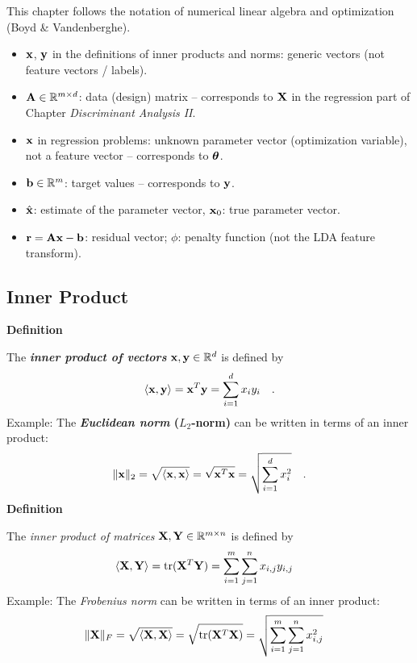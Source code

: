 This chapter follows the notation of numerical linear algebra and optimization (Boyd \& Vandenberghe).\autocite{boyd2004}

\begin{itemize}
  \item $\bm{\mathrm{x}}$, $\bm{\mathrm{y}}$ in the definitions of inner products and norms: generic vectors (not feature vectors / labels).
  \item $\mathbf{A}\in\mathbb{R}^{m\times d}$: data (design) matrix -- corresponds to $\mathbf{X}$ in the regression part of Chapter \emph{Discriminant Analysis II}.
  \item $\bm{\mathrm{x}}$ in regression problems: unknown parameter vector (optimization variable), not a feature vector -- corresponds to $\bm{\mathrm{\theta}}$.
  \item $\bm{\mathrm{b}}\in\mathbb{R}^m$: target values -- corresponds to $\bm{\mathrm{y}}$.
  \item $\hat{\bm{\mathrm{x}}}$: estimate of the parameter vector, $\bm{\mathrm{x}}_0$: true parameter vector.
  \item $\bm{\mathrm{r}} = \mathbf{A}\bm{\mathrm{x}}-\bm{\mathrm{b}}$: residual vector; $\phi$: penalty function (not the LDA feature transform).
\end{itemize}

\subsection{Inner Product}

 \textbf{Definition}

The \textbf{\emph{inner product of vectors}} $\bm{\mathrm{x}}, \bm{\mathrm{y}}\in \mathbb{R}^d$ is defined by \autocite{trefethen1997,golub1996}
    \begin{displaymath}
      \langle\bm{\mathrm{x}}, \bm{\mathrm{y}}\rangle = \bm{\mathrm{x}}^T \bm{\mathrm{y}} = \sum_{i=1}^d x_iy_i \quad .
    \end{displaymath}
Example: The \textbf{\emph{Euclidean norm} ($L_2$-norm)} can be written in terms of an inner product:
    \begin{displaymath}
      \| \bm{\mathrm{x}} \|_2 = \sqrt{\langle \bm{\mathrm{x}}, \bm{\mathrm{x}} \rangle } = 
      \sqrt{ \bm{\mathrm{x}}^T \bm{\mathrm{x}}} = 
      \sqrt{\sum_{i=1}^d x_i^2 }\quad .
    \end{displaymath}
\textbf{Definition}

    The \emph{inner product of matrices} $\mathbf{X}, \mathbf{Y}\in \mathbb{R}^{m\times n}$ is defined by 
    \begin{displaymath}
       \langle \mathbf{X}, \mathbf{Y} \rangle = 
       \mbox{tr}(\mathbf{X}^T \mathbf{Y}) = 
       \sum_{i=1}^m \sum_{j=1}^n x_{i,j} y_{i,j} \quad
    \end{displaymath}
 Example:  The \emph{Frobenius norm} can be written in terms of an inner product:
    \begin{displaymath}
      \| \mathbf{X} \|_F = 
      \sqrt{ \langle \mathbf{X}, \mathbf{X} \rangle } =
      \sqrt{ \mbox{tr}(\mathbf{X}^T \mathbf{X})} =
      \sqrt{ \sum_{i=1}^m \sum_{j=1}^n x_{i,j}^2} \quad
    \end{displaymath}

